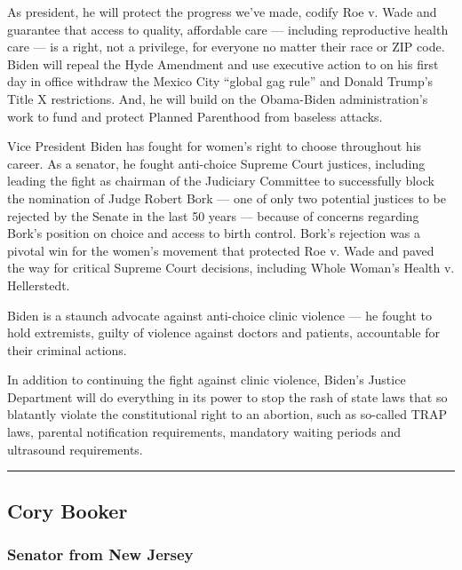As president, he will protect the progress we've made, codify Roe v.
Wade and guarantee that access to quality, affordable care --- including
reproductive health care --- is a right, not a privilege, for everyone
no matter their race or ZIP code. Biden will repeal the Hyde Amendment
and use executive action to on his first day in office withdraw the
Mexico City ``global gag rule'' and Donald Trump's Title X restrictions.
And, he will build on the Obama-Biden administration's work to fund and
protect Planned Parenthood from baseless attacks.

Vice President Biden has fought for women's right to choose throughout
his career. As a senator, he fought anti-choice Supreme Court justices,
including leading the fight as chairman of the Judiciary Committee to
successfully block the nomination of Judge Robert Bork --- one of only
two potential justices to be rejected by the Senate in the last 50 years
--- because of concerns regarding Bork's position on choice and access
to birth control. Bork's rejection was a pivotal win for the women's
movement that protected Roe v. Wade and paved the way for critical
Supreme Court decisions, including Whole Woman's Health v. Hellerstedt.

Biden is a staunch advocate against anti-choice clinic violence --- he
fought to hold extremists, guilty of violence against doctors and
patients, accountable for their criminal actions.

In addition to continuing the fight against clinic violence, Biden's
Justice Department will do everything in its power to stop the rash of
state laws that so blatantly violate the constitutional right to an
abortion, such as so-called TRAP laws, parental notification
requirements, mandatory waiting periods and ultrasound requirements.

\begin{center}\rule{0.5\linewidth}{\linethickness}\end{center}

\hypertarget{cory-booker}{%
\subsection{Cory Booker}\label{cory-booker}}

\hypertarget{senator-from-new-jersey}{%
\subsubsection{Senator from New Jersey}\label{senator-from-new-jersey}}

